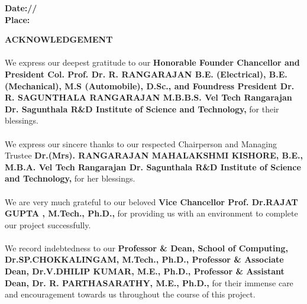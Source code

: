 \documentclass[10pt,openany]{report}
\begin{document}
\vspace{1.0cm}
\begin{flushleft}
\large{\textbf{Date:\hspace*{1.0cm}/\hspace*{2.0cm}/}}\\
\large{\textbf{Place:}}
\end{flushleft}
\newpage
\begin{center}
\LARGE{\textbf{ACKNOWLEDGEMENT}}\\[1cm]
\end{center}
\linespread{1.13}
\begin{sloppypar}

\large{\paragraph{}We express our deepest gratitude to our \textbf{Honorable Founder Chancellor and President
Col. Prof. Dr. R. RANGARAJAN B.E. (Electrical), B.E. (Mechanical), M.S
(Automobile), D.Sc., and Foundress President Dr. R. SAGUNTHALA RANGARAJAN
M.B.B.S. Vel Tech Rangarajan Dr. Sagunthala
R\&D Institute of Science and Technology,} for their blessings.
\large{\paragraph{}We express our sincere thanks to our respected Chairperson and Managing Trustee \textbf{Dr.(Mrs).
RANGARAJAN MAHALAKSHMI KISHORE, B.E., M.B.A. Vel Tech Rangarajan Dr. Sagunthala
R\&D Institute of Science and Technology,} for her blessings. 

\large{\paragraph{}We are very much grateful to our beloved \textbf{Vice Chancellor Prof. Dr.RAJAT
GUPTA , M.Tech., Ph.D.,} for providing us with an environment to complete our project successfully.}
\large{\paragraph{}We record indebtedness to our \textbf{Professor \& Dean, School of Computing, Dr.SP.CHOKKALINGAM, M.Tech., Ph.D., Professor \& Associate Dean,  Dr.V.DHILIP KUMAR, M.E., Ph.D., Professor \& Assistant Dean, Dr. R. PARTHASARATHY, M.E., Ph.D., }  for their immense care and encouragement
towards us throughout the course of this project.}

}}
\end{sloppypar}
\end{document}
